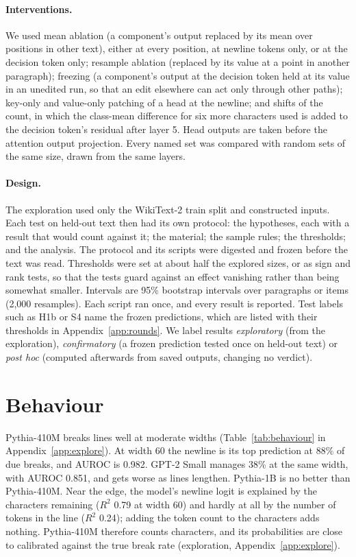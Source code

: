\documentclass[11pt,a4paper]{article}
\begin{document}
\paragraph{Interventions.}
We used mean ablation (a component's output replaced by its mean over positions in other text), either at every position, at newline tokens only, or at the decision token only; resample ablation (replaced by its value at a point in another paragraph); freezing (a component's output at the decision token held at its value in an unedited run, so that an edit elsewhere can act only through other paths); key-only and value-only patching of a head at the newline; and shifts of the count, in which the class-mean difference for six more characters used is added to the decision token's residual after layer 5. Head outputs are taken before the attention output projection. Every named set was compared with random sets of the same size, drawn from the same layers.

\paragraph{Design.}
The exploration used only the WikiText-2 train split and constructed inputs. Each test on held-out text then had its own protocol: the hypotheses, each with a result that would count against it; the material; the sample rules; the thresholds; and the analysis. The protocol and its scripts were digested and frozen before the text was read. Thresholds were set at about half the explored sizes, or as sign and rank tests, so that the tests guard against an effect vanishing rather than being somewhat smaller. Intervals are 95\% bootstrap intervals over paragraphs or items (2,000 resamples). Each script ran once, and every result is reported. Test labels such as H1b or S4 name the frozen predictions, which are listed with their thresholds in Appendix~\ref{app:rounds}. We label results \emph{exploratory} (from the exploration), \emph{confirmatory} (a frozen prediction tested once on held-out text) or \emph{post hoc} (computed afterwards from saved outputs, changing no verdict).

\section{Behaviour}

Pythia-410M breaks lines well at moderate widths (Table~\ref{tab:behaviour} in Appendix~\ref{app:explore}). At width 60 the newline is its top prediction at 88\% of due breaks, and AUROC is 0.982. GPT-2 Small manages 38\% at the same width, with AUROC 0.851, and gets worse as lines lengthen. Pythia-1B is no better than Pythia-410M. Near the edge, the model's newline logit is explained by the characters remaining ($R^2$ 0.79 at width 60) and hardly at all by the number of tokens in the line ($R^2$ 0.24); adding the token count to the characters adds nothing. Pythia-410M therefore counts characters, and its probabilities are close to calibrated against the true break rate (exploration, Appendix~\ref{app:explore}).
\end{document}
